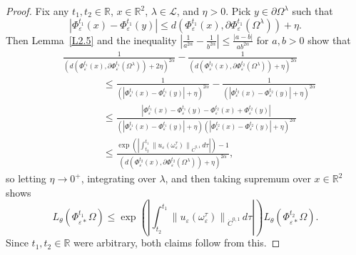 \documentclass[reqno,centertags,12pt]{amsart}
\theoremstyle{definition}
\numberwithin{equation}{section}
\newcommand{\abs}[1]{\left\lvert#1\right\rvert}
\newcommand{\norm}[1]{\left\|#1\right\|}
\newcommand{\bbR}{{\mathbb{R}}}
\newcommand{\eps}{\varepsilon}
\newcommand{\tht}{\theta}
\begin{document}
\begin{proof}
    Fix any $t_{1},t_{2}\in\bbR$, $x\in\bbR^{2}$, $\lambda\in\mathcal{L}$, and $\eta>0$.
    Pick $y\in\partial\Omega^{\lambda}$ such that
    \[
      \abs{\Phi_{\eps}^{t_{1}}(x) - \Phi_{\eps}^{t_{1}}(y)} \le   
      d(\Phi_{\eps}^{t_{1}}(x), \partial\Phi_{\eps}^{t_{1}}(\Omega^{\lambda})) + \eta.
    \]
    Then Lemma~\ref{L2.5} and
    the inequality $\abs{\frac{1}{a^{2\alpha}} - \frac{1}{b^{2\alpha}}}
    \leq \frac{\abs{a - b}}{ab^{2\alpha}}$ for $a,b>0$ show that
    \begin{equation}\label{2.4}
        \begin{aligned}
            &\frac{1}{\left(
                d(\Phi_{\eps}^{t_{1}}(x),
                \partial\Phi_{\eps}^{t_{1}}(\Omega^{\lambda})) + 2\eta
            \right)^{2\alpha}}
            - \frac{1}{\left(
                d(\Phi_{\eps}^{t_{2}}(x),
                \partial\Phi_{\eps}^{t_{2}}(\Omega^{\lambda})) + \eta
            \right)^{2\alpha}}
            \\&\quad\quad\quad\quad
            \leq \frac{1}{\left(
                \abs{\Phi_{\eps}^{t_{1}}(x) - \Phi_{\eps}^{t_{1}}(y)} + \eta
            \right)^{2\alpha}}
            - \frac{1}{\left(
                \abs{\Phi_{\eps}^{t_{2}}(x) - \Phi_{\eps}^{t_{2}}(y)} + \eta
            \right)^{2\alpha}}
            \\&\quad\quad\quad\quad
            \leq \frac{\abs{\Phi_{\eps}^{t_{1}}(x) - \Phi_{\eps}^{t_{1}}(y)
            - \Phi_{\eps}^{t_{2}}(x) + \Phi_{\eps}^{t_{2}}(y)}}
            {\left(\abs{\Phi_{\eps}^{t_{1}}(x) - \Phi_{\eps}^{t_{1}}(y)} + \eta\right)
            \left(\abs{\Phi_{\eps}^{t_{2}}(x) - \Phi_{\eps}^{t_{2}}(y)} + \eta\right)^{2\alpha}}
            \\&\quad\quad\quad\quad
            \leq \frac{\exp\left(\abs{
                \int_{t_{2}}^{t_{1}}
                \norm{u_{\eps}(\omega_{\eps}^{\tau})}_{\dot{C}^{0,1}}\,d\tau
            }\right) - 1}
            {(d(\Phi_{\eps}^{t_{2}}(x),
            \partial\Phi_{\eps}^{t_{2}}(\Omega^{\lambda})) + \eta)^{2\alpha}},
        \end{aligned}
    \end{equation}
    so letting $\eta\to 0^{+}$, integrating over $\lambda$,
    and then taking supremum over $x\in\bbR^2$ shows
    \[
        L_{\tht}(\Phi_{\eps*}^{t_{1}}\Omega)
        \leq \exp\left(\abs{
            \int_{t_{2}}^{t_{1}}
            \norm{u_{\eps}(\omega_{\eps}^{\tau})}_{\dot{C}^{0,1}}\,d\tau
        }\right)L_{\tht}(\Phi_{\eps*}^{t_{2}}\Omega).
    \]
    Since $t_{1},t_{2}\in\bbR$ were arbitrary, both claims follow from this.
\end{proof}
\end{document}
